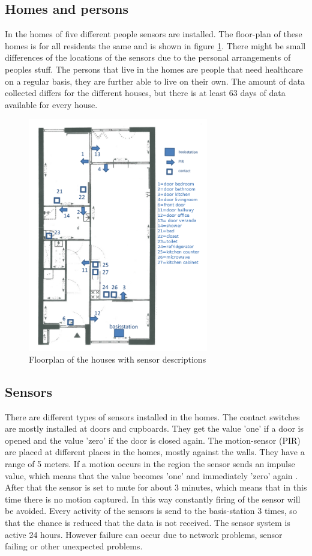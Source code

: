 \documentclass[a4paper,fleqn]{article}
\begin{document}
\subsection{Homes and persons}
In the homes of five different people sensors are installed. The floor-plan of these homes is for all residents the same and is shown in figure \ref{fig:floorplan}. There might be small differences of the locations of the sensors due to the personal arrangements of peoples stuff.
The persons that live in the homes are people that need healthcare on a regular basis, they are further able to live on their own. The amount of data collected differs for the different houses, but there is at least 63 days of data available for every house.

\begin{figure}[h]
\centering
 \includegraphics[width=0.7\textwidth]{Pictures/floorplan.png}
 \caption{Floorplan of the houses with sensor descriptions}
 \label{fig:floorplan}
\end{figure}


\subsection{Sensors}
There are different types of sensors installed in the homes. The contact switches are mostly installed at doors and cupboards. They get the value 'one' if a door is opened and the value 'zero' if the door is closed again.
The motion-sensor (PIR) are placed at different places in the homes, mostly against the walls. They have a range of 5 meters. If a motion occurs in the region the sensor sends an impulse value, which means that the value becomes 'one' and immediately 'zero' again . After that the sensor is set to mute for about 3 minutes, which means that in this time there is no motion captured. In this way constantly firing of the sensor will be avoided. Every activity of the sensors is send to the basis-station 3 times, so that the chance is reduced that the data is not received. The sensor system is active 24 hours. However failure can occur due to network problems, sensor failing or other unexpected problems.
\end{document}
